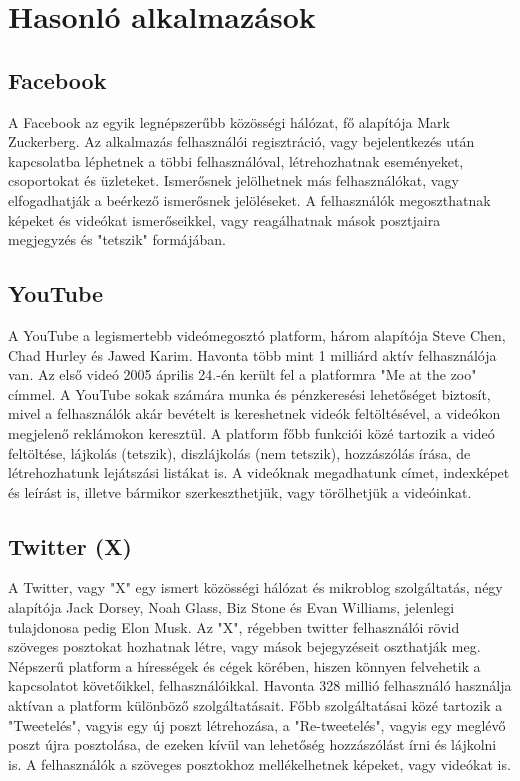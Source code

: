 \documentclass[
]{thesis-ekf}
\theoremstyle{definition}
\theoremstyle{remark}
\begin{document}
\section{Hasonló alkalmazások}
\subsection{Facebook}

A Facebook az egyik legnépszerűbb közösségi hálózat, fő alapítója Mark Zuckerberg. Az alkalmazás felhasználói regisztráció, vagy bejelentkezés után kapcsolatba léphetnek a többi felhasználóval, létrehozhatnak eseményeket, csoportokat és üzleteket. Ismerősnek jelölhetnek más felhasználókat, vagy elfogadhatják a beérkező ismerősnek jelöléseket. A felhasználók megoszthatnak képeket és videókat ismerőseikkel, vagy reagálhatnak mások posztjaira megjegyzés és "tetszik" formájában.

\subsection{YouTube}

A YouTube a legismertebb videómegosztó platform, három alapítója Steve Chen, Chad Hurley és Jawed Karim. Havonta több mint 1 milliárd aktív felhasználója van. Az első videó 2005 április 24.-én került fel a platformra "Me at the zoo" címmel. A YouTube sokak számára munka és pénzkeresési lehetőséget biztosít, mivel a felhasználók akár bevételt is kereshetnek videók feltöltésével, a videókon megjelenő reklámokon keresztül. A platform főbb funkciói közé tartozik a videó feltöltése, lájkolás (tetszik), diszlájkolás (nem tetszik), hozzászólás írása, de létrehozhatunk lejátszási listákat is. A videóknak megadhatunk címet, indexképet és leírást is, illetve bármikor szerkeszthetjük, vagy törölhetjük a videóinkat.

\subsection{Twitter (X)}

A Twitter, vagy "X" egy ismert közösségi hálózat és mikroblog szolgáltatás, négy alapítója Jack Dorsey, Noah Glass, Biz Stone és Evan Williams, jelenlegi tulajdonosa pedig Elon Musk. Az "X", régebben twitter felhasználói rövid szöveges posztokat hozhatnak létre, vagy mások bejegyzéseit oszthatják meg. Népszerű platform a hírességek és cégek körében, hiszen könnyen felvehetik a kapcsolatot követőikkel, felhasználóikkal. Havonta 328 millió felhasználó használja aktívan a platform különböző szolgáltatásait. Főbb szolgáltatásai közé tartozik a "Tweetelés", vagyis egy új poszt létrehozása, a "Re-tweetelés", vagyis egy meglévő poszt újra posztolása, de ezeken kívül van lehetőség hozzászólást írni és lájkolni is. A felhasználók a szöveges posztokhoz mellékelhetnek képeket, vagy videókat is.
\end{document}
